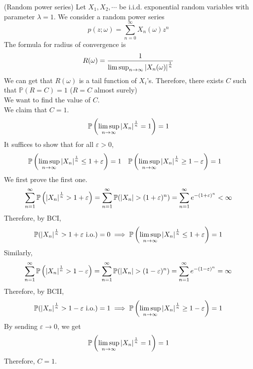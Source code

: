 \documentclass{huhtakm-template-book}
\newcommand{\prob}{\mathbb{P}}
\begin{document}
\begin{eg}(Random power series)
	Let $X_{1},X_{2},\cdots$ be i.i.d. exponential random variables with parameter $\lambda=1$. We consider a random power series
	\begin{equation*}
		p(z;\omega)=\sum_{n=0}^{\infty}X_{n}(\omega)z^{n}
	\end{equation*}
	The formula for radius of convergence is
	\begin{equation*}
		R(\omega)=\frac{1}{\limsup_{n\to\infty}\left|{X_{n}(\omega)}\right|^{\frac{1}{n}}}
	\end{equation*}
	We can get that $R(\omega)$ is a tail function of $X_{i}$'s. Therefore, there exists $C$ such that $\prob(R=C)=1$ ($R=C$ almost surely)\\
	We want to find the value of $C$.\\
	We claim that $C=1$.
	\begin{equation*}
		\prob\left(\limsup_{n\to\infty}\abs{X_{n}}^{\frac{1}{n}}=1\right)=1
	\end{equation*}
	It suffices to show that for all $\varepsilon>0$,
	\begin{align*}
		\prob\left(\limsup_{n\to\infty}\abs{X_{n}}^{\frac{1}{n}}\leq 1+\varepsilon\right)&=1 & \prob\left(\limsup_{n\to\infty}\abs{X_{n}}^{\frac{1}{n}}\geq 1-\varepsilon\right)&=1
	\end{align*}
	We first prove the first one.
	\begin{equation*}
		\sum_{n=1}^{\infty}\prob\left(\abs{X_{n}}^{\frac{1}{n}}>1+\varepsilon\right)=\sum_{n=1}^{\infty}\prob(\abs{X_{n}}>(1+\varepsilon)^{n})=\sum_{n=1}^{\infty}e^{-(1+\varepsilon)^{n}}<\infty
	\end{equation*}
	Therefore, by BCI,
	\begin{equation*}
		\prob(\abs{X_{n}}^{\frac{1}{n}}>1+\varepsilon\text{ i.o.})=0\implies\prob\left(\limsup_{n\to\infty}\abs{X_{n}}^{\frac{1}{n}}\leq 1+\varepsilon\right)=1
	\end{equation*}
	Similarly,
	\begin{equation*}
		\sum_{n=1}^{\infty}\prob\left(\abs{X_{n}}^{\frac{1}{n}}>1-\varepsilon\right)=\sum_{n=1}^{\infty}\prob(\abs{X_{n}}>(1-\varepsilon)^{n})=\sum_{n=1}^{\infty}e^{-(1-\varepsilon)^{n}}=\infty
	\end{equation*}
	Therefore, by BCII,
	\begin{equation*}
		\prob(\abs{X_{n}}^{\frac{1}{n}}>1-\varepsilon\text{ i.o.})=1\implies\prob\left(\limsup_{n\to\infty}\abs{X_{n}}^{\frac{1}{n}}\geq 1-\varepsilon\right)=1
	\end{equation*}
	By sending $\varepsilon\to 0$, we get
	\begin{equation*}
		\prob\left(\limsup_{n\to\infty}\abs{X_{n}}^{\frac{1}{n}}=1\right)=1
	\end{equation*}
	Therefore, $C=1$.
\end{eg}
\end{document}
